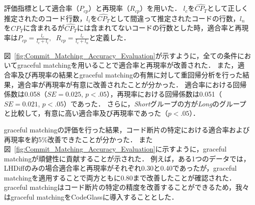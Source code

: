 評価指標として適合率（$P_{cp}$）と再現率（$R_{cp}$）を用いた．
$l_c$を$\widehat{CP_{T}}$として正しく推定されたのコード行数，$l_i$を$\widehat{CP_{T}}$として間違って推定されたコードの行数，$l_n$を$CP_{T}$に含まれるが$\widehat{CP_{T}}$には含まれてないコードの行数とした時，適合率と再現率は$P_{cp} = \frac{l_c}{l_c + l_i},\;\; R_{cp} = \frac{l_c}{l_c + l_n}$と定義した．  


図~\ref{fig:Commit_Matching_Accuracy_Evaluation}が示すように，全ての条件においてgraceful matchingを用いることで適合率と再現率が改善された．
また，適合率及び再現率の結果とgraceful matchingの有無に対して重回帰分析を行った結果，適合率が再現率が有意に改善されたことが分かった．
適合率における回帰係数は0.058（$SE=0.025$, $p<.05$），再現率における回帰係数は0.051（$SE=0.021$, $p<.05$）であった．
さらに，\textit{Short}グループの方が\textit{Long}のグループと比較して，有意に高い適合率及び再現率であった（$p<.05$）．


graceful matchingの評価を行った結果，コード断片の特定における適合率および再現率を約5\%改善できたことが分かった．
また図~\ref{fig:Commit_Matching_Accuracy_Evaluation}に示すように，graceful matchingが頑健性に貢献することが示された．
例えば，ある1つのデータでは，LHDiffのみの場合適合率と再現率がそれぞれ0.30と0.40であったが，graceful matchingを適用することで両方ともに0.80まで改善したことが確認された．
graceful matchingはコード断片の特定の精度を改善することができるため，我々はgraceful matchingをCodeGlassに導入することとした．

